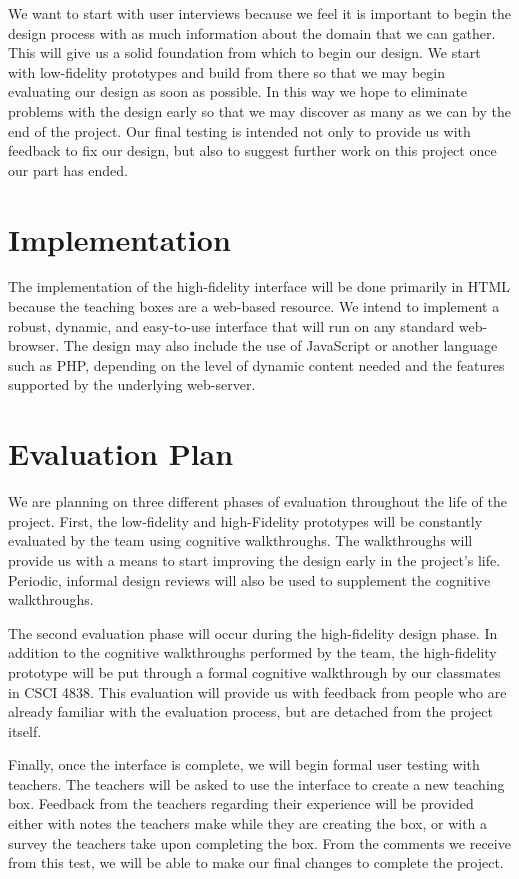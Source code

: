 \documentclass[11pt,letter]{article}
\begin{document}
We want to start with user interviews because we feel it is important to begin
the design process with as much information about the domain that we can gather.
This will give us a solid foundation from which to begin our design. We start
with low-fidelity prototypes and build from there so that we may begin
evaluating our design as soon as possible. In this way we hope to eliminate
problems with the design early so that we may discover as many as we can by the
end of the project. Our final testing is intended not only to provide us with
feedback to fix our design, but also to suggest further work on this project
once our part has ended.

\section{Implementation}
The implementation of the high-fidelity interface will be done primarily in HTML
because the teaching boxes are a web-based resource.  We intend to implement a
robust, dynamic, and easy-to-use interface that will run on any standard
web-browser.  The design may also include the use of JavaScript or another
language such as PHP, depending on the level of dynamic content needed and the
features supported by the underlying web-server.

\section{Evaluation Plan}
We are planning on three different phases of evaluation throughout the life of
the project. First, the low-fidelity and high-Fidelity prototypes will be
constantly evaluated by the team using cognitive walkthroughs. The walkthroughs
will provide us with a means to start improving the design early in the
project's life. Periodic, informal design reviews will also be used to
supplement the cognitive walkthroughs.

The second evaluation phase will occur during the high-fidelity design phase.
In addition to the cognitive walkthroughs performed by the team, the
high-fidelity prototype will be put through a formal cognitive walkthrough by
our classmates in CSCI 4838. This evaluation will provide us with feedback from
people who are already familiar with the evaluation process, but are detached
from the project itself.

Finally, once the interface is complete, we will begin formal user testing with
teachers. The teachers will be asked to use the interface to create a new
teaching box. Feedback from the teachers regarding their experience will be
provided either with notes the teachers make while they are creating the box, or
with a survey the teachers take upon completing the box. From the comments we
receive from this test, we will be able to make our final changes to complete
the project.
\end{document}
